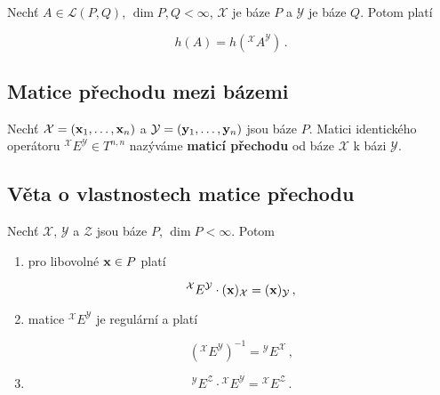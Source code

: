 Nechť $A\in\mathcal L(P,Q)$, $\dim P,Q < \infty$, $\mathcal X$ je báze $P$ a
$\mathcal Y$ je báze $Q$. Potom platí

\[ h(A)=h\left({}^{\mathcal X}A^{\mathcal Y}\right)\,. \]

\subsection*{Matice přechodu mezi bázemi}

Nechť $\mathcal X=(\mathbf{x}_1,\dots,\mathbf{x}_n)$ a $\mathcal Y=(\mathbf{y}_1,\dots,\mathbf{y}_n)$ jsou
báze $P$. Matici identického operátoru ${}^{\mathcal X}E^{\mathcal Y}\in
    T^{n,n}$ nazýváme \textbf{maticí přechodu} od báze $\mathcal X$ k bázi
$\mathcal Y$.

\subsection*{Věta o vlastnostech matice přechodu}

Nechť $\mathcal X$, $\mathcal Y$ a $\mathcal{Z}$ jsou báze $P$, $\dim P <
    \infty$. Potom

\begin{enumerate}
    \item pro libovolné $\mathbf{x}\in P$ platí

          \[ {}^\mathcal X E^\mathcal Y\cdot(\mathbf{x})_\mathcal X =(\mathbf{x})_\mathcal Y\,, \]

    \item matice ${}^\mathcal X E^\mathcal Y$ je regulární a platí

          \[ \left({}^\mathcal X E^\mathcal Y\right)^{-1}= {}^\mathcal Y E^\mathcal X\,, \]

    \item

          \[ {}^\mathcal Y E^\mathcal{Z}\cdot{}^\mathcal X E^\mathcal Y={}^\mathcal X E^\mathcal{Z}\,. \]
\end{enumerate}

\pagebreak